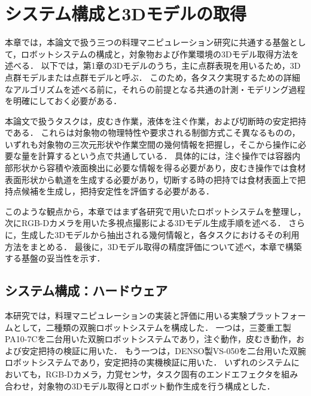 \chapter{システム構成と3Dモデルの取得}
\label{ch:system}

本章では，本論文で扱う三つの料理マニピュレーション研究に共通する基盤として，ロボットシステムの構成と，対象物および作業環境の3Dモデル取得方法を述べる．
以下では，第1章の3Dモデルのうち，主に点群表現を用いるため，3D点群モデルまたは点群モデルと呼ぶ．
このため，各タスク実現するための詳細なアルゴリズムを述べる前に，それらの前提となる共通の計測・モデリング過程を明確にしておく必要がある．

本論文で扱うタスクは，皮むき作業，液体を注ぐ作業，および切断時の安定把持である．
これらは対象物の物理特性や要求される制御方式こそ異なるものの，いずれも対象物の三次元形状や作業空間の幾何情報を把握し，そこから操作に必要な量を計算するという点で共通している．
具体的には，注ぐ操作では容器内部形状から容積や液面検出に必要な情報を得る必要があり，皮むき操作では食材表面形状から軌道を生成する必要があり，切断する時の把持では食材表面上で把持点候補を生成し，把持安定性を評価する必要がある．


このような観点から，本章ではまず各研究で用いたロボットシステムを整理し，次にRGB-Dカメラを用いた多視点撮影による3Dモデル生成手順を述べる．
さらに，生成した3Dモデルから抽出される幾何情報と，各タスクにおけるその利用方法をまとめる．
最後に，3Dモデル取得の精度評価について述べ，本章で構築する基盤の妥当性を示す．

\section{システム構成：ハードウェア}
\label{sec:system:hardware}

本研究では，料理マニピュレーションの実装と評価に用いる実験プラットフォームとして，二種類の双腕ロボットシステムを構成した．
一つは，三菱重工製PA10-7Cを二台用いた双腕ロボットシステムであり，注ぐ動作，皮むき動作，および安定把持の検証に用いた．
もう一つは，DENSO製VS-050を二台用いた双腕ロボットシステムであり，安定把持の実機検証に用いた．
いずれのシステムにおいても，RGB-Dカメラ，力覚センサ，タスク固有のエンドエフェクタを組み合わせ，対象物の3Dモデル取得とロボット動作生成を行う構成とした．

